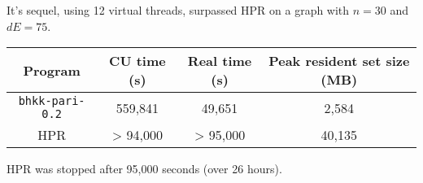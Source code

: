 \documentclass[a4paper]{article}
\newcommand{\code}{\texttt}
\begin{document}
It's sequel, using 12 virtual threads, surpassed HPR on a graph with $n = 30$ and $dE = 75$.

\begin{center}
 \begin{tabular}{|c|c|c|c|} \hline
  Program & CU time (s) & Real time (s) & Peak resident set size (MB) \\ \hline
  \code{bhkk-pari-0.2} & 559,841 & 49,651 & 2,584 \\ \hline
  HPR & > 94,000 & > 95,000 & 40,135 \\ \hline
 \end{tabular}
\end{center}

HPR was stopped after 95,000 seconds (over 26 hours).

% 
% 
% 
\end{document}
